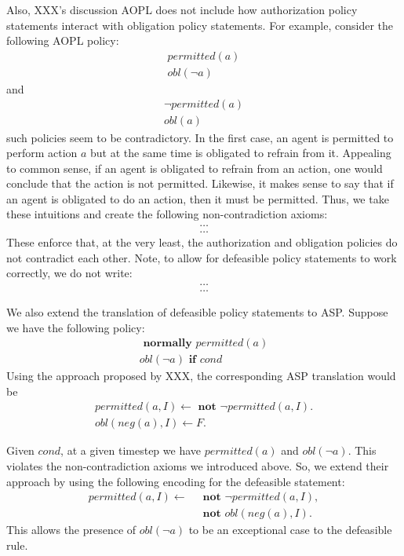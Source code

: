 Also, XXX's discussion AOPL does not include how authorization policy statements interact with obligation policy statements.
For example, consider the following AOPL policy:
\begin{gather}
    permitted(a) \\
    obl(\neg a)
\end{gather}
and
\begin{gather}
    \neg permitted(a) \\
    obl(a)
\end{gather}
such policies seem to be contradictory.
In the first case, an agent is permitted to perform action $a$ but at the same time is obligated to refrain from it.
Appealing to common sense, if an agent is obligated to refrain from an action, one would conclude that the action is not permitted.
Likewise, it makes sense to say that if an agent is obligated to do an action, then it must be permitted.
Thus, we take these intuitions and create the following non-contradiction axioms:
\begin{gather}
    \dots \\
    \dots
\end{gather}
These enforce that, at the very least, the authorization and obligation policies do not contradict each other.
Note, to allow for defeasible policy statements to work correctly, we do not write:
\begin{gather}
    \dots \\
    \dots
\end{gather}

We also extend the translation of defeasible policy statements to ASP.
Suppose we have the following policy:
\begin{gather}
    \textbf{ normally } permitted(a) \\
    obl(\neg a) \textbf{ if } cond
\end{gather}
Using the approach proposed by XXX, the corresponding ASP translation would be
\begin{gather}
    permitted(a, I) \leftarrow \textbf{ not } \neg permitted(a, I). \\
    obl(neg(a), I) \leftarrow F.
\end{gather}

Given $cond$, at a given timestep we have $permitted(a)$ and $obl(\neg a)$.
This violates the non-contradiction axioms we introduced above.
So, we extend their approach by using the following encoding for the defeasible statement:
\begin{equation}
\begin{split}
    permitted(a, I) \leftarrow \
        & \textbf{ not } \neg permitted(a, I), \\
        & \textbf{ not } obl(neg(a), I).
\end{split}
\end{equation}
This allows the presence of $obl(\neg a)$ to be an exceptional case to the defeasible rule.


